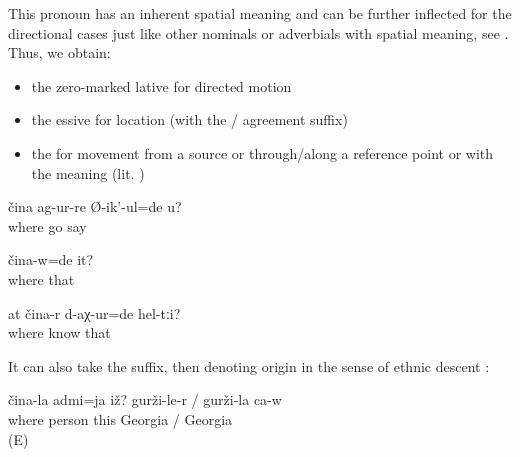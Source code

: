This pronoun has an inherent spatial meaning and can be further inflected for the directional cases just like other nominals or adverbials with spatial meaning, see . Thus, we obtain:
%
\begin{itemize}
	\item	the zero-marked lative  for directed motion 
	\item	the essive  for location (with the / agreement suffix) 
	\item	the   for movement from a source or through\slash along a reference point or with the meaning  (lit. ) 
\end{itemize}
%
\begin{exe}
	\ex	\label{ex:Are you (masc.) asking where he went}
	\gll	čina	ag-ur-re	Ø-ik'-ul=de	u?\\
		where	go	say	\\
	\glt	{}

	\ex	\label{ex:Where was he}
	\gll	čina-w=de	it?\\
		where	that\\
	\glt	{}

	\ex	\label{ex:How did you get to know them (= the medical plants)}
	\gll	at	čina-r	d-aχ-ur=de	hel-tːi?\\
			where	know	that\\
	\glt	{}
\end{exe}

It can also take the  suffix, then denoting origin in the sense of ethnic descent :
%
\begin{exe}
	\ex	\label{ex:Where is this person from? (He) is from Georgia (i.e. he is Georgian)}
	\gll	čina-la	admi=ja	iž?	gurži-le-r	/	gurži-la	ca-w\\
		where	person	this	Georgia	/	Georgia	\\
	\glt	{} (E)
\end{exe}


